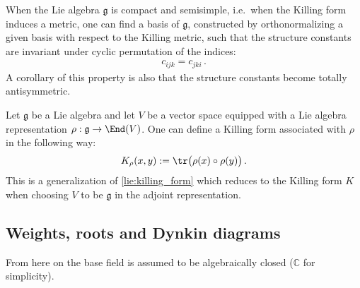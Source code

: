     \begin{property}
        When the Lie algebra $\mathfrak{g}$ is compact and semisimple, i.e.~when the Killing form induces a metric, one can find a basis of $\mathfrak{g}$, constructed by orthonormalizing a given basis with respect to the Killing metric, such that the structure constants are invariant under cyclic permutation of the indices:
        \begin{gather}
            c_{ijk} = c_{jki}\,.
        \end{gather}
        A corollary of this property is also that the structure constants become totally antisymmetric.
    \end{property}

    \begin{construct}\label{lie:rho_killing_form}
        Let $\mathfrak{g}$ be a Lie algebra and let $V$ be a vector space equipped with a Lie algebra representation $\rho:\mathfrak{g}\rightarrow\End(V)$. One can define a Killing form associated with $\rho$ in the following way:
        \begin{gather}
            K_\rho(x,y) := \tr\bigl(\rho(x)\circ\rho(y)\bigr)\,.
        \end{gather}
        This is a generalization of \cref{lie:killing_form} which reduces to the Killing form $K$ when choosing $V$ to be $\mathfrak{g}$ in the adjoint representation.
    \end{construct}

\subsection{Weights, roots and Dynkin diagrams}\label{section:weights_roots}

    From here on the base field is assumed to be algebraically closed ($\mathbb{C}$ for simplicity).


